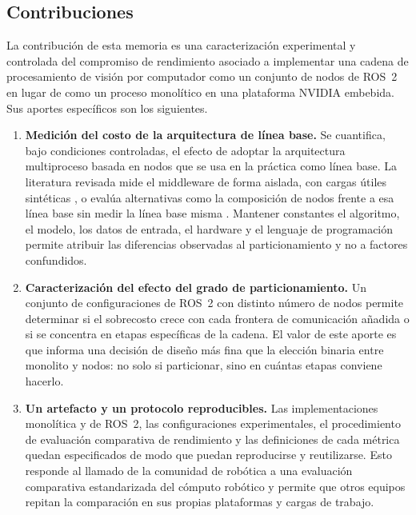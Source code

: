 \subsection{Contribuciones}
\label{sec:contributions}

La contribución de esta memoria es una caracterización experimental y
controlada del compromiso de rendimiento asociado a implementar una cadena de
procesamiento de visión por computador como un conjunto de nodos de ROS~2 en
lugar de como un proceso monolítico en una plataforma NVIDIA embebida. Sus
aportes específicos son los siguientes.

\begin{enumerate}[leftmargin=*]
  \item \textbf{Medición del costo de la arquitectura de línea base.} Se
        cuantifica, bajo condiciones controladas, el efecto de adoptar la
        arquitectura multiproceso basada en nodos que se usa en la práctica
        como línea base. La literatura revisada mide el middleware de forma
        aislada, con cargas útiles sintéticas \cite{maruyama2016,
        kronauer2021, kamiya2025, luo2025, zhang2024}, o evalúa alternativas
        como la composición de nodos frente a esa línea base sin medir la
        línea base misma \cite{macenski2023}. Mantener constantes el
        algoritmo, el modelo, los datos de entrada, el hardware y el lenguaje
        de programación permite atribuir las diferencias observadas al
        particionamiento y no a factores confundidos.

  \item \textbf{Caracterización del efecto del grado de particionamiento.}
        Un conjunto de configuraciones de ROS~2 con distinto número de nodos
        permite determinar si el sobrecosto crece con cada frontera de
        comunicación añadida o si se concentra en etapas específicas de la
        cadena. El valor de este aporte es que informa una decisión de diseño
        más fina que la elección binaria entre monolito y nodos: no solo si
        particionar, sino en cuántas etapas conviene hacerlo.

  \item \textbf{Un artefacto y un protocolo reproducibles.} Las
        implementaciones monolítica y de ROS~2, las configuraciones
        experimentales, el procedimiento de evaluación comparativa de
        rendimiento y las definiciones de cada métrica quedan especificados
        de modo que puedan reproducirse y reutilizarse. Esto responde al
        llamado de la comunidad de robótica a una evaluación comparativa
        estandarizada del cómputo robótico \cite{mayoral-vilches2024} y
        permite que otros equipos repitan la comparación en sus propias
        plataformas y cargas de trabajo.


\end{enumerate}
